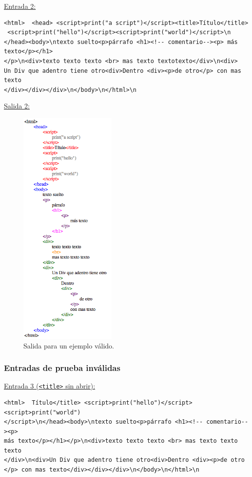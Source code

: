 \underline{Entrada 2:}

\begin{verbatim}
<html>  <head> <script>print("a script")</script><title>Título</title>
 <script>print("hello")</script><script>print("world")</script>\n
</head><body>\ntexto suelto<p>párrafo <h1><!-- comentario--><p> más texto</p></h1>
</p>\n<div>texto texto texto <br> mas texto textotexto</div>\n<div>
Un Div que adentro tiene otro<div>Dentro <div><p>de otro</p> con mas texto
</div></div></div>\n</body>\n</html>\n
\end{verbatim}

\underline{Salida 2:}

\begin{figure}[h!]
\includegraphics[width=4.8cm]{img/ejemplo2.png}
      \caption{Salida para un ejemplo válido.}
      \label{salida2}
\end{figure}

\newpage 

\subsubsection{Entradas de prueba inválidas}

\underline{Entrada 3 (\texttt{<title>} sin abrir):}
\begin{verbatim}
<html>  Título</title> <script>print("hello")</script><script>print("world")
</script>\n</head><body>\ntexto suelto<p>párrafo <h1><!-- comentario--><p> 
más texto</p></h1></p>\n<div>texto texto texto <br> mas texto texto texto
</div>\n<div>Un Div que adentro tiene otro<div>Dentro <div><p>de otro
</p> con mas texto</div></div></div>\n</body>\n</html>\n
	\end{verbatim}
    
